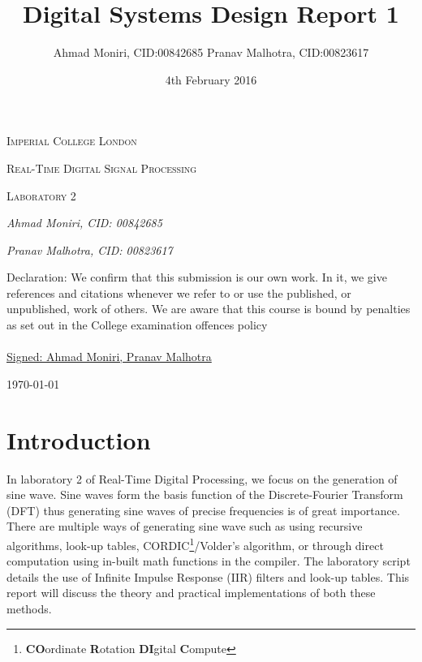\documentclass{article}
\title{Digital Systems Design Report 1}
\author{
    Ahmad Moniri, CID:\num{00842685}
    Pranav Malhotra, CID:\num{00823617}
}
\date{4th February 2016}
\begin{document}
\begin{titlepage}
	\centering
	{\scshape\LARGE Imperial College London \par}
	\vspace{2cm}
	{\scshape\Large Real-Time Digital Signal Processing \par}
	\vspace{1cm}
	{\scshape\Large Laboratory 2\par}
	\vspace{2.5cm}
	{\Large\itshape Ahmad Moniri, CID: 00842685 \par}
	\vspace{1cm}
	{\Large\itshape Pranav Malhotra, CID: 00823617 \par}
	\vfill
	\begin{tcolorbox}
    \centering
    Declaration: We confirm that this submission is our own work. In it, we give references and citations whenever we refer to or use the published, or
    unpublished, work of others. We are aware that this course is bound by
    penalties as set out in the College examination offences policy \\~\\
    \underline{Signed: Ahmad Moniri, Pranav Malhotra}
    \end{tcolorbox}
	{\large \today\par}
\end{titlepage}

\tableofcontents

\newpage
\section{Introduction}
In laboratory 2 of Real-Time Digital Processing, we focus on the generation of sine wave. Sine waves form the basis function of the Discrete-Fourier Transform (DFT) thus generating sine waves of precise frequencies is of great importance. There are multiple ways of generating sine wave such as using recursive algorithms, look-up tables, CORDIC\footnote{\textbf{CO}ordinate \textbf{R}otation \textbf{DI}gital \textbf{C}ompute}/Volder's algorithm, or through direct computation using in-built math functions in the compiler. The laboratory script details the use of Infinite Impulse Response (IIR) filters and look-up tables. This report will discuss the theory and practical implementations of both these methods.
\end{document}

